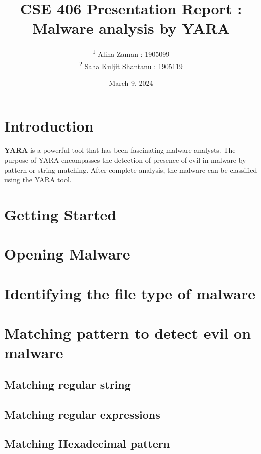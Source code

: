 \documentclass{article}
\title{ CSE 406 Presentation Report : Malware analysis by YARA }
\author{ \textsuperscript{1} Alina Zaman : 1905099 \\
\textsuperscript{2} Saha Kuljit Shantanu : 1905119}
\date{March 9, 2024}
\begin{document}
\maketitle

\section{ Introduction }

\textbf{YARA} is a powerful tool that has been fascinating malware analysts. The purpose of YARA encompasses the detection of presence of evil in malware by pattern or string matching. After complete analysis, the malware can be classified using the YARA tool.

\section{ Getting Started }



\section{ Opening Malware }



\section{ Identifying the file type of malware }



\section{ Matching pattern to detect evil on malware }

\subsection{ Matching regular string }



\subsection{ Matching regular expressions }



\subsection{ Matching Hexadecimal pattern }
\end{document}
